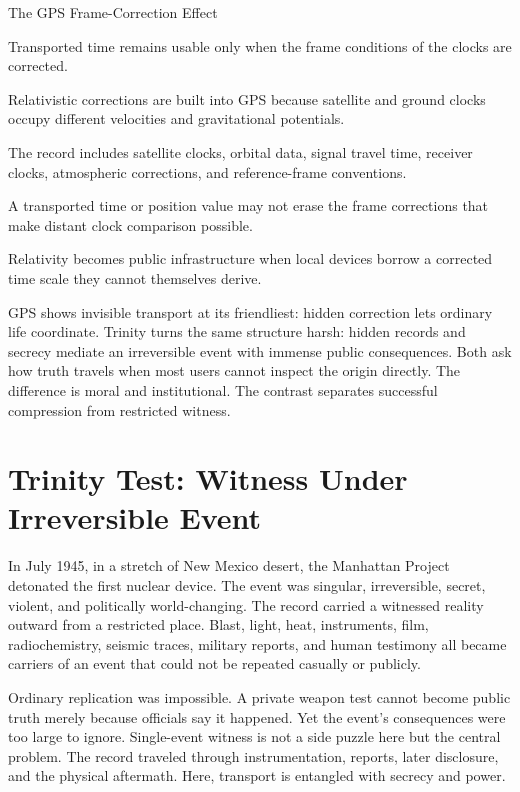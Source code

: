 \begin{phenom}{The GPS Frame-Correction Effect~\cite{ashby2003}}
\label{ph:gps-frame-correction}

\PhStatement
Transported time remains usable only when the frame conditions of the clocks
are corrected.

\PhOrigin
Relativistic corrections are built into GPS because satellite and ground clocks
occupy different velocities and gravitational potentials.

\PhObservation
The record includes satellite clocks, orbital data, signal travel time,
receiver clocks, atmospheric corrections, and reference-frame conventions.

\PhConstraint
A transported time or position value may not erase the frame corrections that
make distant clock comparison possible.

\PhConsequence
Relativity becomes public infrastructure when local devices borrow a corrected
time scale they cannot themselves derive.
\end{phenom}

GPS shows invisible transport at its friendliest: hidden correction lets
ordinary life coordinate. Trinity turns the same structure harsh: hidden
records and secrecy mediate an irreversible event with immense public
consequences. Both ask how truth travels when most users cannot inspect
the origin directly. The difference is moral and institutional. The
contrast separates successful compression from restricted witness.

\section{Trinity Test: Witness Under Irreversible Event}

In July 1945, in a stretch of New Mexico desert, the Manhattan Project
detonated the first nuclear device. The event was singular, irreversible,
secret, violent, and politically world-changing. The record carried a
witnessed reality outward from a restricted place. Blast, light, heat,
instruments, film, radiochemistry, seismic traces, military reports, and
human testimony all became carriers of an event that could not be
repeated casually or publicly.

Ordinary replication was impossible. A private weapon test cannot become
public truth merely because officials say it happened. Yet the event's
consequences were too large to ignore. Single-event witness is not a side
puzzle here but the central problem. The record traveled through
instrumentation, reports, later disclosure, and the physical aftermath.
Here, transport is entangled with secrecy and power.

